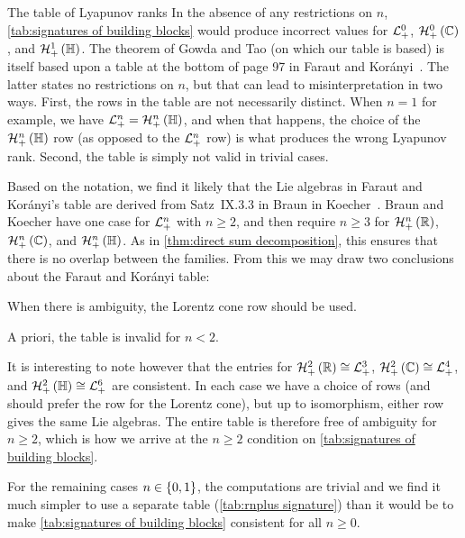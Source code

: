 \documentclass{interact}
\theoremstyle{plain}
\theoremstyle{definition}
\theoremstyle{remark}
\begin{document}
  \appendix
  \begin{section}{The table of Lyapunov ranks}
    In the absence of any restrictions on $n$, \cref{tab:signatures of
      building blocks} would produce incorrect values for
    $\Lnplus[0]$, $\Hnplus[0]\of{\Cn[1]}$, and
    $\Hnplus[1]\of{\quaternions}$. The theorem of Gowda and Tao (on
    which our table is based) is itself based upon a table at the
    bottom of page 97 in Faraut and Korányi~\cite{faraut-koranyi}. The
    latter states no restrictions on $n$, but that can lead to
    misinterpretation in two ways. First, the rows in the table are
    not necessarily distinct. When $n = 1$ for example, we have
    $\Lnplus = \Hnplus\of{\quaternions}$, and when that happens, the
    choice of the $\Hnplus\of{\quaternions}$ row (as opposed to the
    $\Lnplus$ row) is what produces the wrong Lyapunov rank. Second,
    the table is simply not valid in trivial cases.

    Based on the notation, we find it likely that the Lie algebras in
    Faraut and Korányi's table are derived from Satz~IX.3.3 in Braun
    in Koecher~\cite{braun-koecher}. Braun and Koecher have one case
    for $\Lnplus$ with $n \ge 2$, and then require $n \ge 3$ for
    $\Hnplus\of{\Rn[1]}$, $\Hnplus\of{\Cn[1]}$, and
    $\Hnplus\of{\quaternions}$. As in \cref{thm:direct sum
      decomposition}, this ensures that there is no overlap between
    the families. From this we may draw two conclusions about the
    Faraut and Korányi table:

    \begin{enumerate}
      \begin{item}
        When there is ambiguity, the Lorentz cone row should be used.
      \end{item}
      \begin{item}
        A priori, the table is invalid for $n < 2$.
      \end{item}
    \end{enumerate}

    It is interesting to note however that the entries for
    $\Hnplus[2]\of{\Rn[1]} \cong \Lnplus[3]$, $\Hnplus[2]\of{\Cn[1]}
    \cong \Lnplus[4]$, and $\Hnplus[2]\of{\quaternions} \cong
    \Lnplus[6]$ are consistent. In each case we have a choice of rows
    (and should prefer the row for the Lorentz cone), but up to
    isomorphism, either row gives the same Lie algebras. The entire
    table is therefore free of ambiguity for $n \ge 2$, which is how
    we arrive at the $n \ge 2$ condition on \cref{tab:signatures of
      building blocks}.

    For the remaining cases $n \in \set{0,1}$, the computations are
    trivial and we find it much simpler to use a separate table
    (\cref{tab:rnplus signature}) than it would be to make
    \cref{tab:signatures of building blocks} consistent for all $n \ge
    0$.
  \end{section}
\end{document}
